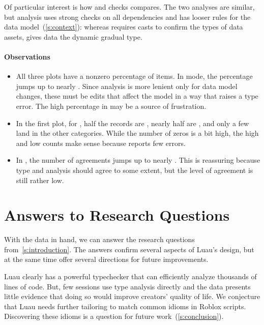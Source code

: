 \documentclass[english,submission,cleveref]{programming}
\begin{document}
Of particular interest is how \mstrict{} and \FS{} checks compares.
The two analyses are similar, but \FS{} analysis uses strong checks
on all dependencies and has looser rules for the data model~(\cref{s:context}):
whereas \mstrict{} requires casts to confirm the types of data assets,
\FS{} gives data the dynamic gradual type.


\paragraph{Observations}

\begin{itemize}
  \item
    All three plots have a nonzero percentage of  items.
    In \mstrict{} mode, the percentage jumps up to nearly .
    Since \FS{} analysis is more lenient only for data model changes, these must
    be edits that affect the model in a way that raises a type error.
    The high percentage in \mstrict{} may be a source of frustration.

  \item
    In the first plot, for \mnocheck{},
    half the records are , nearly half are , and only a few
    land in the other categories.
    While the number of zeros is a bit high, the high  and low
     counts make sense because \mnocheck{} reports few errors.

  \item
    In \mnonstrict{}, the number of agreements jumps up to nearly .
    This is reassuring because type and \FS{} analysis should agree to some extent,
    but the level of agreement is still rather low.

\end{itemize}



\section{Answers to Research Questions}
\label{s:discussion}

With the data in hand, we can answer the research questions
from~\cref{s:introduction}.
The answers confirm several aspects of Luau's design, but
at the same time offer several directions for future improvements.

Luau clearly has a powerful typechecker that can efficiently
analyze thousands of lines of code.
But, few sessions use type analysis directly and the data presents little
evidence that doing so would improve creators' quality of life.
We conjecture that Luau needs further tailoring to match
common idioms in Roblox scripts.
Discovering these idioms is a question for future work~(\cref{s:conclusion}).
\end{document}
